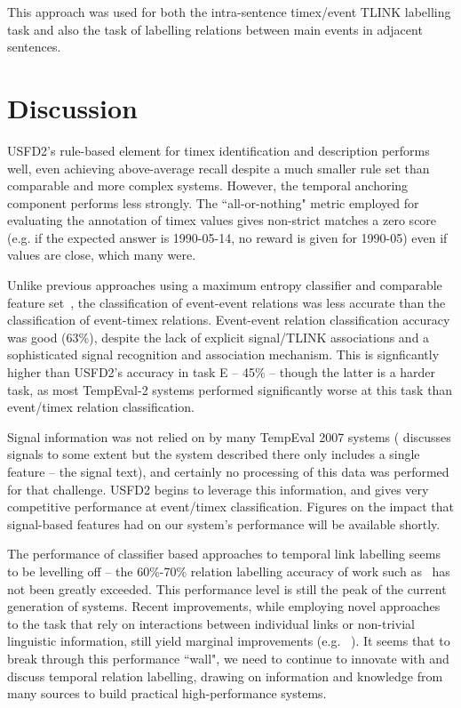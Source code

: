 \documentclass[11pt]{article}
\begin{document}
This approach was used for both the intra-sentence timex/event TLINK labelling task and also the task of labelling relations between main events in adjacent sentences.

\section{Discussion}
\label{discussion}
USFD2's rule-based element for timex identification and description performs well, even achieving above-average recall despite a much smaller rule set than comparable and more complex systems. However, the temporal anchoring component performs less strongly. The ``all-or-nothing" metric employed for evaluating the annotation of timex values gives non-strict matches a zero score (e.g. if the expected answer is 1990-05-14, no reward is given for 1990-05) even if values are close, which many were.

Unlike previous approaches using a maximum entropy classifier and comparable feature set~\cite{mani2006machine,derczynski2010signals}, the classification of event-event relations was less accurate than the classification of event-timex relations. Event-event relation classification accuracy was good (63\%), despite the lack of explicit signal/TLINK associations and a sophisticated signal recognition and association mechanism. This is signficantly higher than USFD2's accuracy in task E -- 45\% -- though the latter is a harder task, as most TempEval-2 systems performed significantly worse at this task than event/timex relation classification.

Signal information was not relied on by many TempEval 2007 systems ( discusses signals to some extent but the system described there only includes a single feature -- the signal text), and certainly no processing of this data was performed for that challenge. USFD2 begins to leverage this information, and gives very competitive performance at event/timex classification. Figures on the impact that signal-based features had on our system's performance will be available shortly.

The performance of classifier based approaches to temporal link labelling seems to be levelling off -- the 60\%-70\% relation labelling accuracy of work such as~ has not been greatly exceeded. This performance level is still the peak of the current generation of systems. Recent improvements, while employing novel approaches to the task that rely on interactions between individual links or non-trivial linguistic information, still yield marginal improvements (e.g. ~). It seems that to break through this performance ``wall", we need to continue to innovate with and discuss temporal relation labelling, drawing on information and knowledge from many sources to build practical high-performance systems.
\end{document}
